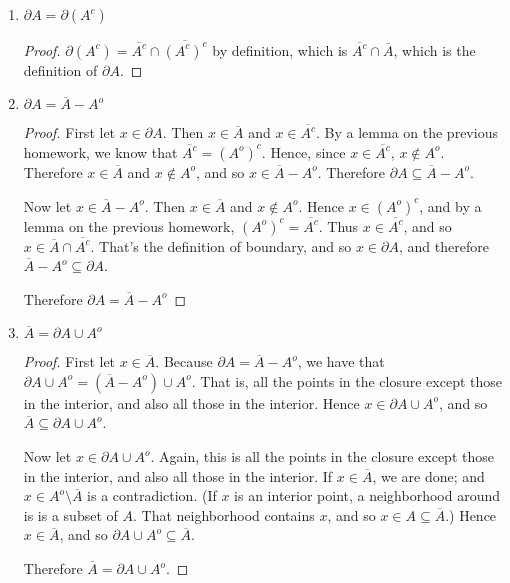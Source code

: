 \documentclass{article}
\newcommand{\ol}[1]{\overline{#1}}
\begin{document}
\renewcommand{\labelenumi}{(\alph{enumi})}
\begin{enumerate}
    \item %
    $\partial A = \partial(A^c)$
    \begin{proof}
        $\partial(A^c) = \overline{A^c} \cap \ol{(A^c)^c}$ by definition, which is $\ol {A^c} \cap \ol A$, which is the definition of $\partial A$.
    \end{proof}


    \item %
    $\partial A = \overline{A} - A^o$
    \begin{proof}
        First let $x \in \partial A$. Then $x \in \ol{A}$ and $x \in \ol{A^c}$. By a lemma on the previous homework, we know that $\ol{A^c} = (A^o)^c$. Hence, since $x \in \ol{A^c}$, $x \notin A^o$. Therefore $x \in \ol{A}$ and $x \notin A^o$, and so $x \in \ol{A} - A^o$. Therefore $\partial A \subseteq \ol{A} - A^o$.

        Now let $x \in \ol{A} - A^o$. Then $x \in \ol{A}$ and $x \notin A^o$. Hence $x \in (A^o)^c$, and by a lemma on the previous homework, $(A^o)^c = \ol{A^c}$. Thus $x \in \ol{A^c}$, and so $x \in \ol{A} \cap \ol{A^c}$. That's the definition of boundary, and so $x \in \partial{A}$, and therefore $\ol{A} - A^o \subseteq \partial A$. 

        Therefore $\partial A = \overline{A} - A^o$
    \end{proof}


    \item %
    $\overline{A} = \partial A \cup A^o$
    \begin{proof}
        First let $x \in \ol{A}$. 
        Because $\partial A = \ol{A} - A^o$, we have that $\partial A \cup A^o = (\ol{A} - A^o) \cup A^o$. That is, all the points in the closure except those in the interior, and also all those in the interior. Hence $x \in \partial A \cup A^o$, and so $\ol{A} \subseteq \partial A \cup A^o$.

        Now let $x \in \partial A \cup A^o$. Again, this is all the points in the closure except those in the interior, and also all those in the interior. If $x \in \ol{A}$, we are done; and $x \in A^o \setminus \ol{A}$ is a contradiction. (If $x$ is an interior point, a neighborhood around is is a subset of $A$. That neighborhood contains $x$, and so $x \in A \subseteq \ol{A}$.) Hence $x \in \ol{A}$, and so $\partial A \cup A^o \subseteq \ol{A}$.

        Therefore $\ol{A} = \partial A \cup A^o$.        
    \end{proof}



\end{enumerate}
\end{document}

